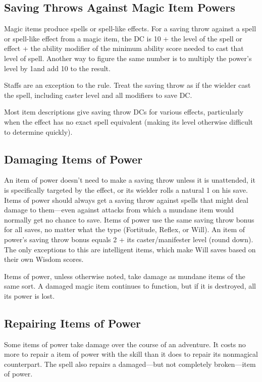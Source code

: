 \subsection{Saving Throws Against Magic Item Powers}
Magic items produce spells or spell-like effects. For a saving throw against a spell or spell-like effect from a magic item, the DC is 10 + the level of the spell or effect + the ability modifier of the minimum ability score needed to cast that level of spell. Another way to figure the same number is to multiply the power’s level by 1\onehalf and add 10 to the result.

Staffs are an exception to the rule. Treat the saving throw as if the wielder cast the spell, including caster level and all modifiers to save DC.

Most item descriptions give saving throw DCs for various effects, particularly when the effect has no exact spell equivalent (making its level otherwise difficult to determine quickly).

\subsection{Damaging Items of Power}
An item of power doesn't need to make a saving throw unless it is unattended, it is specifically targeted by the effect, or its wielder rolls a natural 1 on his save. Items of power should always get a saving throw against spells that might deal damage to them---even against attacks from which a mundane item would normally get no chance to save. Items of power use the same saving throw bonus for all saves, no matter what the type (Fortitude, Reflex, or Will). An item of power's saving throw bonus equals 2 + \onehalf its caster/manifester level (round down). The only exceptions to this are intelligent items, which make Will saves based on their own Wisdom scores.

Items of power, unless otherwise noted, take damage as mundane items of the same sort. A damaged magic item continues to function, but if it is destroyed, all its power is lost.

\subsection{Repairing Items of Power}
Some items of power take damage over the course of an adventure. It costs no more to repair a item of power with the  skill than it does to repair its nonmagical counterpart. The  spell also repairs a damaged---but not completely broken---item of power.

